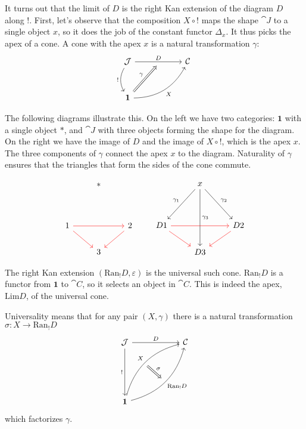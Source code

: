 \documentclass[DaoFP]{subfiles}
\begin{document}
It turns out that the limit of $D$ is the right Kan extension of the diagram $D$ along $!$. First, let's observe that the composition $X \circ !$ maps the shape $\cat J$ to a single object $x$, so it does the job of the constant functor $\Delta_x$. It thus picks the apex of a cone. A cone with the apex $x$ is a natural transformation $\gamma$: 
\[
 \begin{tikzcd} [row sep=1cm, column sep=1cm]
 \cat J
 \arrow[rr, "D", "" {name=ID, below} ]
 \arrow[d, bend right, "!"']
 && \cat C
 \\
 \mathbf 1
  \arrow[urr, bend right, "X"']
 \arrow[Rightarrow, "\gamma",  to=ID]
 \end{tikzcd}
\]

The following diagrams illustrate this. On the left we have two categories: $\mathbf 1$ with a single object $*$, and $\cat J$ with three objects forming the shape for the diagram. On the right we have the image of $D$ and the image of $X \circ !$, which is the apex $x$. The three components of $\gamma$ connect the apex $x$ to the diagram. Naturality of $\gamma$ ensures that the triangles that form the sides of the cone commute.

\[
 \begin{tikzcd}
  & *
 \\
\\
1 
\arrow[rr, red]
\arrow[rd, red]
&& 2
\arrow[dl, red]
\\
& 3
 \end{tikzcd}
 \qquad
 \begin{tikzcd}
  & x
\arrow[ddr, "\gamma_2"]
 \arrow[ddl, "\gamma_1"']
 \arrow[ddd, "\gamma_3"]
 \\
\\
D 1 
\arrow[rr, red]
\arrow[rd, red]
&& D 2
\arrow[dl, red]
\\
& D 3
 \end{tikzcd}
 \]

The right Kan extension $(\text{Ran}_! D, \varepsilon)$ is the universal such cone. $\text{Ran}_! D$ is a functor from $\mathbf 1$ to $\cat C$, so it selects an object in $\cat C$. This is indeed the apex, $\text{Lim} D$, of the universal cone. 

Universality means that for any pair $(X, \gamma)$ there is a natural transformation $\sigma \colon X \to \text{Ran}_! D$ 
\[
\begin{tikzcd}[row sep=2cm, column sep=2cm]
\cat J  \ar[d, "!"', "" {name=P}]
            \ar[r, "D", ""  {name=F, below, near start, bend right}]
&
\cat C
\\
\mathbf 1
    \ar[ur, bend left, "X", "" {name=G, below}]
    \ar[ur, bend right, "\text{Ran}_! D"', "" {name=Ran}]
\arrow[Rightarrow, "\sigma", from=G, to=Ran]
\end{tikzcd}
\]
which factorizes $\gamma$. 
\end{document}
